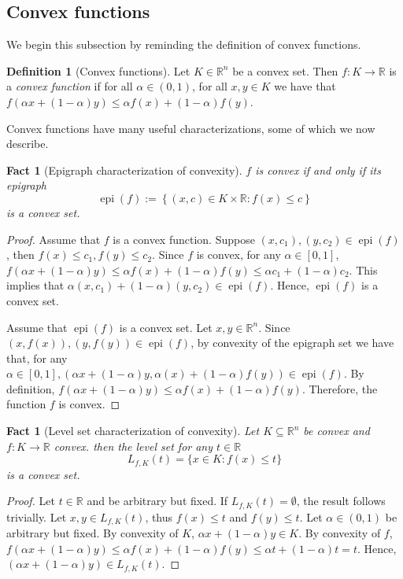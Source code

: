 \documentclass[smallextended,numbook,nospthms]{svjour3}
\theoremstyle{plain}
\newtheorem{fact}[theorem]{Fact}
\theoremstyle{definition}
\newtheorem{definition}[theorem]{Definition}
\def\RR{\mathds R}
\DeclareMathOperator{\epi}{epi}
\begin{document}
\subsection{Convex functions}

We begin this subsection by reminding the definition of convex functions.
\begin{definition}[Convex functions]\label{def:convex f}
	Let $K \in \RR^n$ be a convex set. Then $f:K \rightarrow \RR$ is a \emph{convex function} if for all $\alpha \in (0,1)$, for all $x, y \in K$ we have that $f\left(\alpha x+(1-\alpha) y\right) \leq \alpha f\left(x\right)+(1-\alpha) f\left(y\right)$.
\end{definition}

Convex functions have many useful characterizations, some of which we now describe.

\begin{fact}[Epigraph characterization of convexity]\label{fact:conv char epi}
$f$ is convex if and only if its epigraph
$$
\epi(f):=\left\{(x, c) \in K \times \RR: f(x) \leq c\right\}
$$
is a convex set.
\end{fact}
\begin{proof}
	Assume that $f$ is a convex function. Suppose $\left(x, c_{1}\right),\left(y, c_{2}\right) \in \operatorname{epi}(f)$, then $f(x) \leq c_{1}, f(y) \leq c_{2}$. Since $f$ is convex, for any $\alpha \in[0,1]$, $f(\alpha x+(1-\alpha) y) \leq \alpha f(x)+(1-\alpha) f(y) \leq \alpha c_{1}+(1-\alpha) c_{2}$. This implies that $\alpha\left(x, c_{1}\right)+(1-\alpha)\left(y, c_{2}\right) \in \epi (f)$. Hence, $\epi(f)$ is a convex set.
	
	Assume that $\epi(f)$ is a convex set. Let $x, y \in \RR^{n}$. Since $(x, f(x)),(y, f(y)) \in \epi(f)$, by convexity of the epigraph set we have that, for any $\alpha \in[0,1],(\alpha x+(1-\alpha) y, \alpha(x)+(1-\alpha) f(y)) \in \epi(f)$. By definition, $f(\alpha x+(1-\alpha) y) \leq \alpha f(x)+(1-\alpha) f(y)$. Therefore, the function $f$ is convex.
\end{proof}


\begin{fact}[Level set characterization of convexity]\label{fact:conv level set}
	Let $K \subseteq \RR^n$ be convex and $f:K \rightarrow \RR$ convex. then the level set for any $t \in \RR$
	$$
	L_{f,K}(t)=\{x \in K: f(x) \leq t\}
	$$
	is a convex set.
\end{fact}
\begin{proof}
	Let $t \in \RR$ and be arbitrary but fixed. If $L_{f,K}(t) = \emptyset$, the result follows trivially.
	Let $x,y \in L_{f,K}(t)$, thus $f(x) \leq t$ and $f(y) \leq t$. Let $\alpha \in (0,1)$ be arbitrary but fixed.
	By convexity of $K$,  $\alpha x + (1-\alpha)y \in K$. By convexity of $f$, $f(\alpha x + (1-\alpha)y) \leq \alpha f(x) + (1-\alpha) f(y) \leq \alpha t + (1-\alpha) t = t$. Hence, $(\alpha x + (1-\alpha)y) \in L_{f,K}(t)$.
\end{proof}
\end{document}
